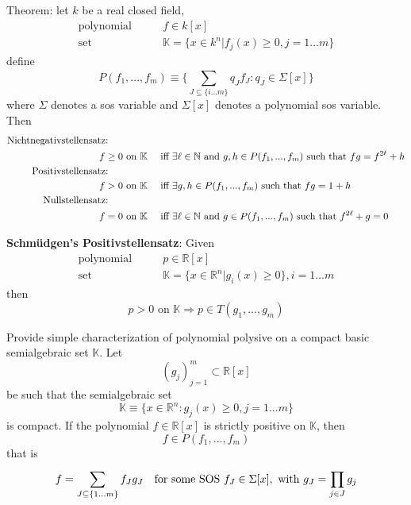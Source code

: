 Theorem: let $k$ be a real closed field,
\begin{align}
\text{polynomial} \qquad & f\in k[x]\\
\text{set}	 \qquad & \mathbb{K}=\{x\in k^n | f_j(x)\geq0, j=1...m\}
\end{align}
define 
\begin{equation}
P(f_1,...,f_m)\equiv \{\sum\limits_{J\subseteq\{i...m\}}^{} q_Jf_J: q_J\in \Sigma[x] \}
\end{equation}
where $\Sigma$ denotes a \gls{sos} variable and $\Sigma[x]$ denotes a polynomial \gls{sos} variable. Then
\begin{align}
\text{Nichtnegativstellensatz:} \qquad\qquad\quad &\nonumber\\
f\geq 0 \text{ on } \mathbb{K} \quad & \textup{ iff } \exists \ell \in \mathbb{N} \textup{ and } g,h\in P(f_1,...,f_m) \text{ such that } fg=f^{2\ell}+h\\
\text{Positivstellensatz:} \qquad\qquad\quad &\nonumber\\
f>0  \text{ on } \mathbb{K} \quad & \textup{ iff } \exists g,h\in P(f_1,...,f_m) \text{ such that } fg=1+h\\
\text{Nullstellensatz:} \qquad\qquad\quad &\nonumber\\
f=0 \text{ on } \mathbb{K} \quad & \textup{ iff } \exists \ell \in \mathbb{N} \textup{ and } g\in P(f_1,...,f_m) \text{ such that } f^{2\ell}+g=0
\end{align}

\citep{bib:sos_putainar_lasserre}

\textbf{Schm\"{u}dgen's Positivstellensatz}: Given
\begin{align}
\text{polynomial} \qquad & p\in\mathbb{R}[x]\\
\text{set} \qquad & \mathbb{K}=\{x\in \mathbb{R}^n | g_i(x)\geq0\}, i=1...m
\end{align}
then
\begin{equation}
p>0 \text{ on } \mathbb{K} \Rightarrow p\in T(g_1,...,g_m)
\end{equation}
\citep{bib:sos_putinar_laurent}

Provide simple characterization of polynomial polysive on a compact basic semialgebraic set $\mathbb{K}$. Let
\begin{equation}
(g_j)_{j=1}^m \subset \mathbb{R}[x]
\end{equation}
be such that the semialgebraic set
\begin{equation}
\mathbb{K}\equiv\{x\in\mathbb{R}^n: g_j(x)\geq 0, j=1...m\}
\end{equation}
is compact. If the polynomial $f\in\mathbb{R}[x]$ is strictly positive on $\mathbb{K}$, then
\begin{equation}
f\in P(f_1,...,f_m)
\end{equation}
that is
\begin{equation}
f = \sum\limits_{J\subseteq\{1...m\}}^{}f_Jg_J \quad \textup{for some SOS } f_J\in\Sigma[x], \textup{ with } g_J=\prod\limits_{j\in J}^{}g_j
\end{equation}
\citep{bib:sos_putainar_lasserre}

